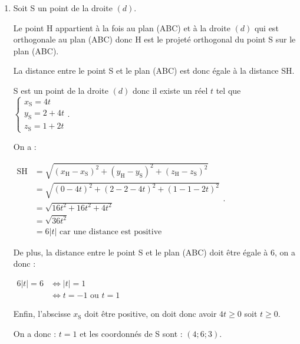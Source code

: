 \begin{enumerate}
	\item   Soit S un point de la droite $(d)$.

	Le point H appartient à la fois au plan (ABC) et à  la droite $(d)$  qui est orthogonale au plan (ABC) donc H est le projeté orthogonal du point S sur le plan (ABC).

	La distance entre le point S et  le plan (ABC) est donc égale à la distance SH.

	S est un point de la droite $(d)$ donc il existe un réel $t$ tel que  $\begin{cases}
		x_\mathrm{S} = 4t \\ y_\mathrm{S}=2+4t \\z_\mathrm{S}=1 +2t \end{cases}$.

	On a :

	$\begin{aligned} \mathrm{SH} &= \sqrt{{ \left(  x_\mathrm{H}-x_\mathrm{S} \right)}^2 +  { \left(  y_\mathrm{H}-y_\mathrm{S} \right)}^2+{ \left(  z_\mathrm{H}-z_\mathrm{S} \right)}^2} \\
		& = \sqrt{ (0 - 4t)^2 + (2-2-4t)^2 + (1- 1-2t)^2}\\
		&= \sqrt{16t^2+16t^2+4t^2}\\
		&= \sqrt{36t^2} \\
		&=6 |t| \text{ car une distance est positive}
	\end{aligned}$.


	De plus, la distance entre le point S et le plan (ABC) doit être égale à 6, on a donc :

	$ \begin{aligned} 6 |t| =6  &\iff  |t| = 1\\
		&\iff   t = - 1\text{ ou } t =  1
	\end{aligned}$

	Enfin, l'abscisse $x_{\mathrm{S}}$ doit être positive, on doit donc avoir $4t \geq 0$ soit $t\geq 0$.

	On a donc : $t=1$ et les coordonnés de S sont : $(4;6;3)$.


\end{enumerate}

